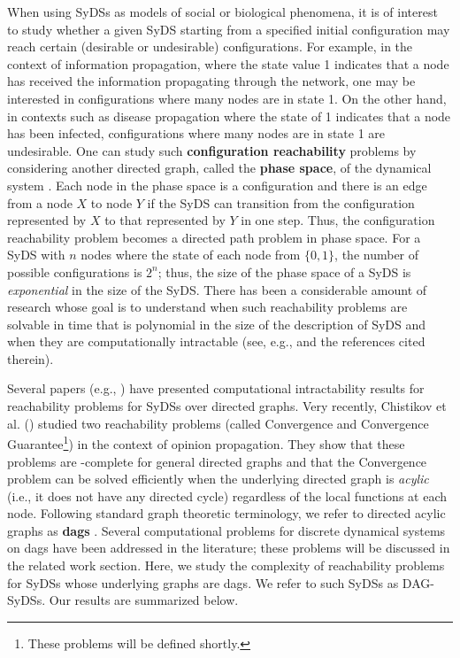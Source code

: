 When using SyDSs as models of social or biological phenomena, it is of interest 
to study whether a given SyDS starting from a specified
initial configuration  may reach certain
(desirable or undesirable) configurations.
For example, in the context of information propagation, where the
state value 1 indicates that a node has received the information
propagating through the network,
one may be interested in configurations where many nodes are in state 1.
On the other hand, in contexts such as disease propagation where
the state of 1 indicates that a node has been infected,
configurations where many nodes are in state 1 are undesirable.
One can study such \textbf{configuration reachability} problems
by considering another directed graph,
called the \textbf{phase space}, of the dynamical system \cite{MR-2007}.
Each node in the phase space is a configuration and there is an
edge from a node $X$ to node $Y$ if the SyDS can transition from
the configuration represented by $X$ to that represented by
$Y$ in one step.
Thus, the configuration reachability problem becomes a directed
path problem in phase space.
For a SyDS with $n$ nodes where the state of each node from $\{0,1\}$,
the number of possible configurations is $2^n$; thus, the size of
the phase space of a SyDS is \emph{exponential} in the size of
the SyDS.
There has been a considerable amount of research whose goal is
to understand when such reachability problems are solvable
in time that is polynomial in the size of the description of SyDS 
and when they are computationally intractable 
(see, e.g., \cite{Chistikov-etal-2020,BH+06,OU-2020,OU-2017,Akutsu-etal-2007}
and the references cited therein).

Several papers (e.g., \cite{OU-2017,Akutsu-etal-2007}) have
presented computational intractability results for reachability 
problems for SyDSs over directed graphs.
Very recently, Chistikov et al. (\citeyear{Chistikov-etal-2020})
studied two reachability problems (called Convergence and Convergence
Guarantee\footnote{These problems will be defined shortly.}) 
in the context of opinion propagation.
They show that these problems are \cpsp-complete for general
directed graphs and
that the Convergence problem can be solved
efficiently when the underlying directed graph is \emph{acylic} (i.e.,
it does not have any directed cycle) regardless of the local functions
at each node.
Following standard graph theoretic terminology, we refer to directed
acylic graphs as \textbf{dags} \cite{CLRS-2009}.
Several computational problems for discrete dynamical systems
on dags have been addressed in the literature; these problems
will be discussed in the related work section.
Here, we study the complexity of reachability problems for
SyDSs whose underlying graphs are dags.
We refer to such SyDSs as DAG-SyDSs.
Our results are summarized below.

